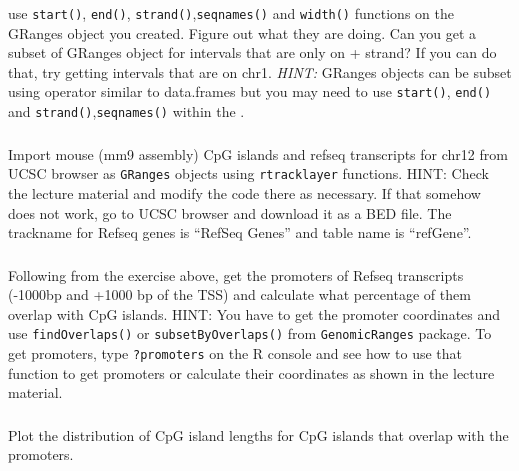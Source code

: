 \documentclass[12pt,]{krantz}
\begin{document}
use \texttt{start()}, \texttt{end()}, \texttt{strand()},\texttt{seqnames()} and \texttt{width()} functions on the GRanges
object you created. Figure out what they are doing. Can you get a subset of GRanges object for intervals that are only on + strand? If you can do that, try getting intervals that are on chr1. \emph{HINT:} GRanges objects can be subset using \protect\hyperlink{section-21}{} operator similar to data.frames but you may need
to use \texttt{start()}, \texttt{end()} and \texttt{strand()},\texttt{seqnames()} within the \protect\hyperlink{section-21}{}.

\hypertarget{section-11}{%
\subsubsection{}\label{section-11}}

Import mouse (mm9 assembly) CpG islands and refseq transcripts for chr12 from UCSC browser as \texttt{GRanges} objects using \texttt{rtracklayer} functions. HINT: Check the lecture material and modify the code there as necessary. If that somehow does not work, go to UCSC browser and download it as a BED file. The trackname for Refseq genes is ``RefSeq Genes'' and table name is ``refGene''.

\hypertarget{section-12}{%
\subsubsection{}\label{section-12}}

Following from the exercise above, get the promoters of Refseq transcripts (-1000bp and +1000 bp of the TSS) and calculate what percentage of them overlap with CpG islands. HINT: You have to get the promoter coordinates and use \texttt{findOverlaps()} or \texttt{subsetByOverlaps()} from \texttt{GenomicRanges} package. To get promoters, type \texttt{?promoters} on the R console and see how to use that function to get promoters or calculate their coordinates as shown in the lecture material.

\hypertarget{section-13}{%
\subsubsection{}\label{section-13}}

Plot the distribution of CpG island lengths for CpG islands that overlap with the
promoters.

\hypertarget{section-14}{%
\subsubsection{}\label{section-14}}
\end{document}
